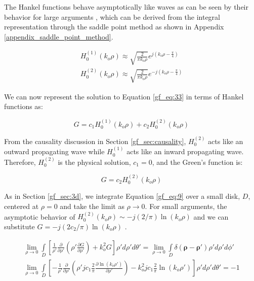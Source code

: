 The Hankel functions behave asymptotically like waves as can be seen by their behavior for large arguments \cite{abramowitz_stegun}, which can be derived from the integral representation through the saddle point method as shown in Appendix \ref{appendix_saddle_point_method}.

\begin{equation}
\begin{gathered}
H_0^{(1)}(k_o\rho) \approx \sqrt{\frac{2}{\pi k_o\rho}}e^{j\left(k_o\rho - \frac{\pi}{4}\right)}\\
H_0^{(2)}(k_o\rho) \approx \sqrt{\frac{2}{\pi k_o\rho}}e^{-j\left(k_o\rho - \frac{\pi}{4}\right)}
\label{gf_eq:36a}
\end{gathered}
\end{equation}
\renewcommand{\baselinestretch}{2} \small\normalsize

We can now represent the solution to Equation \ref{gf_eq:33} in terms of Hankel functions as:

\begin{equation}
G = c_1H_0^{(1)}\left(k_o\rho\right) +c_2H_0^{(2)}\left(k_o\rho\right) 
\label{gf_eq:37}
\end{equation}
\renewcommand{\baselinestretch}{2} \small\normalsize

From the causality discussion in Section \ref{gf_sec:causality}, $H_0^{(2)}$ acts like an outward propagating wave while $H_0^{(1)}$ acts like an inward propagating wave. Therefore, $H_0^{(2)}$ is the physical solution, $c_1=0$, and the Green's function is:

\begin{equation}
G = c_2H_0^{(2)}\left(k_o\rho\right) 
\label{gf_eq:38}
\end{equation}
\renewcommand{\baselinestretch}{2} \small\normalsize

As in Section \ref{gf_sec:3d}, we integrate Equation \ref{gf_eq:9} over a small disk, $D$, centered at $\rho = 0$ and take the limit as $\rho \rightarrow 0$. For small arguments, the asymptotic behavior of $H_0^{(2)}(k_o\rho) \sim -j(2/\pi)\ln\left({k_o\rho}\right)$ and we can substitute $G = -j(2c_2/\pi)\ln\left({k_o\rho}\right)$ \cite{abramowitz_stegun}. 

\begin{equation}
\begin{gathered}
\lim_{\rho\to 0}\int\limits_{D} \left[ \frac{1}{\rho'}\frac{\partial}{\partial \rho'}\left(\rho' \frac{\partial G}{\partial \rho'} \right) + k_o^2G\right]\rho' d\rho' d\theta' = \lim_{\rho\to 0}\int\limits_{D} \delta\left(\boldsymbol{\rho}-\boldsymbol{\rho}' \right)\rho' d\rho' d\phi' \\
\lim_{\rho\to 0}\int\limits_{D} \left[ -\frac{1}{\rho'}\frac{\partial}{\partial \rho'}\left(\rho' jc_1\frac{2}{\pi}\frac{\partial \ln(k_o\rho')}{\partial \rho'} \right) - k_o^2jc_1\frac{2}{\pi}\ln(k_o\rho')\right]\rho' d\rho' d\theta' = -1 \\
\end{gathered}
\label{gf_eq:39}
\end{equation}
\renewcommand{\baselinestretch}{2} \small\normalsize

